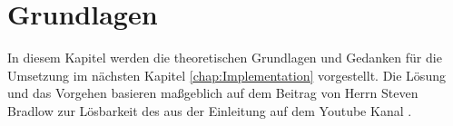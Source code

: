 \chapter{Grundlagen}
In diesem Kapitel werden die theoretischen Grundlagen und Gedanken für die Umsetzung im nächsten Kapitel \ref{chap:Implementation} vorgestellt. Die Lösung und das Vorgehen basieren maßgeblich auf dem Beitrag  von Herrn Steven Bradlow zur Lösbarkeit des  aus der Einleitung auf dem Youtube Kanal  \autocite{Unsolvable-14-15-Numberphile-YT:online}.%
%


%
%
%
%
%
%
%
%

